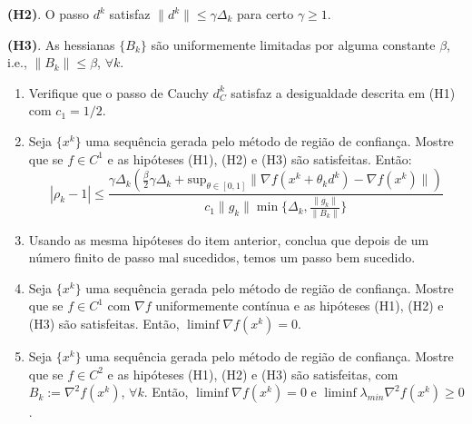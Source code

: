 \documentclass[a4paper,latin]{article}
\begin{document}
\begin{enumerate}
    {\bf (H2)}. O passo $d^{k}$ satisfaz $\|d^k\|\leq \gamma \Delta_k$ para certo 
    $\gamma\geq 1$.
    
    {\bf (H3)}. As hessianas $\{B_k\}$ são uniformemente limitadas por alguma constante $\beta$, i.e., $\|B_k\|\leq \beta$, $\forall k$. 
    
    \begin{enumerate}
    	\item Verifique que o passo de Cauchy 
    	$d_{C}^{k}$ satisfaz a desigualdade
    	descrita em (H1) 
    	com $c_{1}=1/2$. 
    	\item Seja 
    	$\{x^k\}$ uma sequência gerada pelo método de região de confiança.
    	Mostre que se $f \in C^{1}$ e as hipóteses 
    	(H1), (H2)
    	e (H3) são satisfeitas. Então:
    	$$
    	|\rho_k-1|
    	\leq 
    	\frac{\gamma\Delta_{k}\left(\frac{\beta}{2}\gamma \Delta_k+\text{sup}_{\theta \in [0,1]}
    		\|\nabla f(x^k+\theta_kd^k)
    		-\nabla f(x^k)\|\right)}
    	{c_1 \|g_k\| \min \{ \Delta_k, \frac{\|g_{k}\|}{\|B_k\|}\}}$$
    	\item Usando  as mesma hipóteses do item anterior, conclua que 
    	depois de um número finito de passo mal sucedidos, temos um passo bem sucedido. 
    	\item   Seja 
    	$\{x^k\}$ uma sequência gerada pelo método de região de confiança.
    	Mostre que se $f \in C^{1}$ com $\nabla f$ uniformemente contínua e as hipóteses 
    	(H1), (H2)
    	e (H3) são satisfeitas. Então, $\liminf \nabla f(x^k)=0$.
    	\item Seja 
    	$\{x^k\}$ uma sequência gerada pelo método de região de confiança.
    	Mostre que se $f \in C^{2}$ e as hipóteses 
    	(H1), (H2)
    	e (H3) são satisfeitas, com $B_{k}:=\nabla^2 f(x^k)$, $\forall k$.
    	Então,  $\liminf \nabla f(x^k)=0$ e 
    	$\liminf \lambda_{min}\nabla^{2} f(x^k)\geq 0$.
    \end{enumerate}  
 \end{enumerate}
\end{document}
